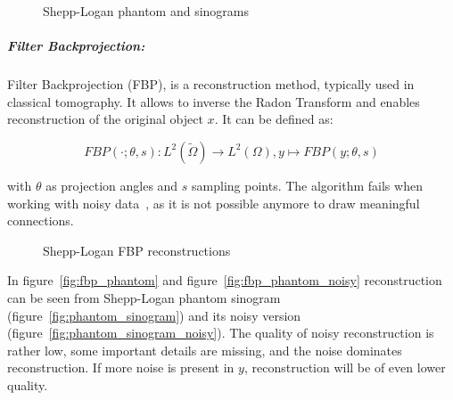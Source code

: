 \begin{figure}[H]
    \label{fig:phantom_and_sinos}
    \hfill
    \hfill
    \hfill
    \hfill
	\caption{Shepp-Logan phantom and sinograms}
\end{figure}

\subparagraph{Filter Backprojection:}
Filter Backprojection \cite{tomographicReconstruction} (FBP), 
is a reconstruction method, typically used in classical tomography.
It allows to inverse the Radon Transform and enables reconstruction of the original object $x$.
It can be defined as:

\begin{equation}
    \label{eq:fbp}
    \textit{FBP}(\cdot; \theta, s) : L^2(\tilde{\Omega}) \to L^2(\Omega), y \mapsto \textit{FBP}(y; \theta, s)
\end{equation}

with $\theta$ as projection angles and $s$ sampling points. 
The algorithm fails when working with noisy data~\cite{cryoEmMath2}, as it is not possible anymore to draw meaningful connections.

\begin{figure}[h]
    \label{fig:phantom_fbps}
    \hfill
    \hfill
    \hfill
    \hfill
	\caption{Shepp-Logan FBP reconstructions}
\end{figure}

In figure~\ref{fig:fbp_phantom} and figure~\ref{fig:fbp_phantom_noisy} reconstruction can be seen from 
Shepp-Logan phantom sinogram (figure~\ref{fig:phantom_sinogram}) and its noisy version (figure~\ref{fig:phantom_sinogram_noisy}).
The quality of noisy reconstruction is rather low, some important details are missing, and the noise dominates reconstruction.
If more noise is present in $y$, reconstruction will be of even lower quality.


